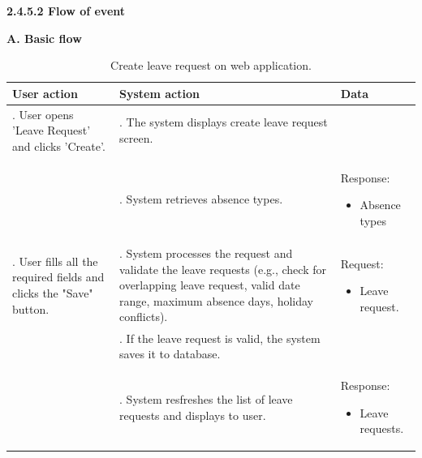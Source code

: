 \vspace{0.5em}
\indent\textbf{2.4.5.2 Flow of event}
\vspace{0.5em}
\par\indent\indent\textbf{A. Basic flow}
\vspace{-0.5em}
\renewcommand{\arraystretch}{1.5}
\begin{longtable}{|>{\raggedright\arraybackslash}p{4.5cm}|
                  >{\raggedright\arraybackslash}p{6cm}|
                  >{\raggedright\arraybackslash}p{4.5cm}|}                  
\caption{Create leave request on web application.}
\label{tab:leave_request_management_create_on_web_basic_flow}\\
\hline
\centering\textbf{User action} & \centering\textbf{System action} & \centering\arraybackslash\textbf{Data} \\
\hline
\endfirsthead
\endhead

1. User opens 'Leave Request' and clicks 'Create'. & 2. The system displays create leave request screen. &\\ 
\hline
& 3. System retrieves absence types.& 
    \par{Response:
        \vspace{-0.8em}
        \begin{itemize}
            \item Absence types
            \vspace{-1.2em}
        \end{itemize}
    } \\
\hline
4. User fills all the required fields and clicks the "Save" button.&5. System processes the request and validate the leave requests (e.g., check for overlapping leave request, valid date range, maximum absence days, holiday conflicts).&
\par{Request: 
        \vspace{-0.8em}
        \begin{itemize}
            \item Leave request.
        \end{itemize}
    }\\
\hline
&6. If the leave request is valid, the system saves it to database.&\\
\hline
&7. System resfreshes the list of leave requests and displays to user.&
\par{Response: 
        \vspace{-0.8em}
        \begin{itemize}
            \item Leave requests.
        \end{itemize}
    }\\
\hline
\end{longtable}

